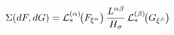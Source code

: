 \documentclass[preview]{standalone}
\begin{document}
\begin{align*}
\special{dvisvgm:raw <g id='unique000'>}\Sigma(dF,dG)=\mathcal{L}_*^{(\alpha)}\!\big(F_{\xi^\alpha}\big)\,\frac{L^{\alpha\beta}}{H_\sigma}\,\mathcal{L}_*^{(\beta)}\!\big(G_{\xi^\beta}\big)\special{dvisvgm:raw </g>}
\end{align*}
\end{document}
